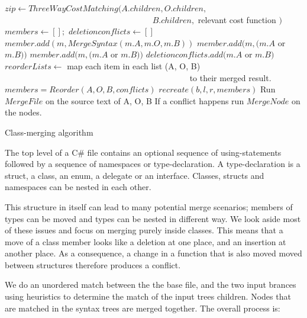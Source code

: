 \documentclass[11pt]{article}
\begin{document}
\begin{algorithm}
\begin{algorithmic}
        \State $zip  \gets ThreeWayCostMatching(A.children, O.children,$
        \State ~~~~~~~~~~~~~~~~~~~~~~~~~~~~~~~~~~~  $B.children,$ relevant cost function $)$  
        \State $members \gets [];$
        \State $deletionconflicts \gets []$
               \State $member.add(m, MergeSyntax(m.A, m.O, m.B))$
              \State $member.add(m, (m.A$ or $m.B ))$
               \State $member.add(m, (m.A$ or $m.B ))$
               \State $deletionconflicts.add(m.A$ or $m.B )$
           \EndIf
           \State $reorderLists \gets $ map each item in each list (A, O, B)
           \State ~~~~~~~~~~~~~~~~~~~~~~~~~~~~~~~~~~~~~~~~~~~~ to their merged result.
           \State $members = Reorder(A, O, B, conflicts)$
       \EndFor
       \State \Return $recreate(b, l, r, members)$
       \State Run $MergeFile$ on the source text of A, O, B
       \State If a conflict happens run $MergeNode$ on the nodes.
    \EndIf
\EndFunction
\end{algorithmic}
\caption{Class-merging algorithm}
\label{TreeMergeAlgorithm}
\end{algorithm}


The top level of a C\# file contains an optional sequence of using-statements followed by a sequence of namespaces or type-declaration. A type-declaration is a struct, a class, an enum, a delegate or an interface. Classes, structs and namespaces can be nested in each other.

This structure in itself can lead to many potential merge scenarios; members of types can be moved and types can be nested in different way. We look aside most of these issues and focus on merging purely inside classes. This means that a move of a class member looks like a deletion at one place, and an insertion at another place. As a consequence, a change in a function that is also moved moved between structures therefore produces a conflict.

We do an unordered match between the the base file, and the two input brances using heuristics to determine the match of the input trees children. Nodes that are matched in the syntax trees are merged together. The overall process is:
\end{document}
